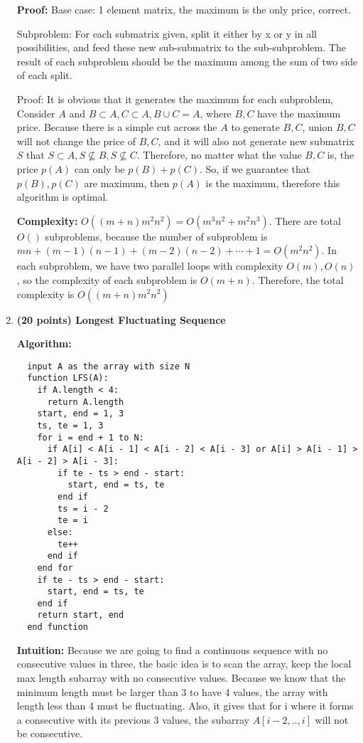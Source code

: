 \documentclass{article}
\newcounter{problem}
\begin{document}
\begin{enumerate}[topsep=0pt]
\textbf{Proof:}
Base case: 1 element matrix, the maximum is the only price, correct.

Subproblem: For each submatrix given, split it either by x or y in all possibilities,
and feed these new sub-submatrix to the sub-subproblem.
The result of each subproblem should be the maximum among the sum of two side of each split.

Proof: It is obvious that it generates the maximum for each subproblem, 
Consider $A$ and $B\subset A,C\subset A,B\cup C=A$, where $B,C$ have the maximum price.
Because there is a simple cut across the $A$ to generate $B,C$, 
union $B,C$ will not change the price of $B,C$, 
and it will also not generate new submatrix $S$ that $S\subset A,S\not\subseteq B,S\not\subseteq C$.
Therefore, no matter what the value $B,C$ is, the price $p(A)$ can only be $p(B)+p(C)$.
So, if we guarantee that $p(B),p(C)$ are maximum, then $p(A)$ is the maximum,
therefore this algorithm is optimal.

\textbf{Complexity:}
$O((m+n)m^2n^2)=O(m^3n^2+m^2n^3)$. There are total $O()$ subproblems, because the number of subproblem is
$mn+(m-1)(n-1)+(m-2)(n-2)+\cdots+1=O(m^2n^2)$.
In each subproblem, we have two parallel loops with complexity $O(m),O(n)$, 
so the complexity of each subproblem is $O(m+n)$.
Therefore, the total complexity is $O((m+n)m^2n^2)$

\item \textbf{(20 points) Longest Fluctuating Sequence}

\textbf{Algorithm:}
\begin{verbatim}
  input A as the array with size N
  function LFS(A):
    if A.length < 4:
      return A.length
    start, end = 1, 3
    ts, te = 1, 3
    for i = end + 1 to N:
      if A[i] < A[i - 1] < A[i - 2] < A[i - 3] or A[i] > A[i - 1] > A[i - 2] > A[i - 3]:
        if te - ts > end - start:
          start, end = ts, te
        end if
        ts = i - 2
        te = i
      else:
        te++
      end if
    end for
    if te - ts > end - start:
      start, end = ts, te
    end if
    return start, end
  end function
\end{verbatim}

\textbf{Intuition:}
Because we are going to find a continuous sequence with no consecutive values in three,
the basic idea is to scan the array, keep the local max length subarray with no consecutive values.
Because we know that the minimum length must be larger than 3 to have 4 values, the array with length less than 4 must be fluctuating.
Also, it gives that for i where it forms a consecutive with its previous 3 values,
the subarray $A[i-2,..,i]$ will not be consecutive.


\end{enumerate}
\end{document}

